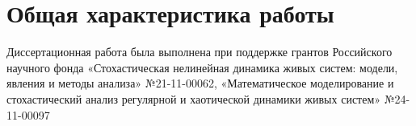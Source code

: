 \section*{Общая характеристика работы}

\newcommand{\actuality}{\pdfbookmark[1]{Актуальность}{actuality}\underline{\textbf{\actualityTXT}}}
\newcommand{\progress}{\pdfbookmark[1]{Разработанность темы}{progress}\underline{\textbf{\progressTXT}}}
\newcommand{\aim}{\pdfbookmark[1]{Цели}{aim}\underline{{\textbf\aimTXT}}}
\newcommand{\tasks}{\pdfbookmark[1]{Задачи}{tasks}\underline{\textbf{\tasksTXT}}}
\newcommand{\aimtasks}{\pdfbookmark[1]{Цели и задачи}{aimtasks}\aimtasksTXT}
\newcommand{\novelty}{\pdfbookmark[1]{Научная новизна}{novelty}\underline{\textbf{\noveltyTXT}}}
\newcommand{\influence}{\pdfbookmark[1]{Практическая значимость}{influence}\underline{\textbf{\influenceTXT}}}
\newcommand{\methods}{\pdfbookmark[1]{Методология и методы исследования}{methods}\underline{\textbf{\methodsTXT}}}
\newcommand{\defpositions}{\pdfbookmark[1]{Положения, выносимые на защиту}{defpositions}\underline{\textbf{\defpositionsTXT}}}
\newcommand{\reliability}{\pdfbookmark[1]{Достоверность}{reliability}\underline{\textbf{\reliabilityTXT}}}
\newcommand{\probation}{\pdfbookmark[1]{Апробация}{probation}\underline{\textbf{\probationTXT}}}
\newcommand{\contribution}{\pdfbookmark[1]{Личный вклад}{contribution}\underline{\textbf{\contributionTXT}}}
\newcommand{\publications}{\pdfbookmark[1]{Публикации}{publications}\underline{\textbf{\publicationsTXT}}}


Диссертационная работа была выполнена при поддержке грантов Российского научного фонда
 «Стохастическая нелинейная динамика живых систем: модели, явления и методы анализа» №21-11-00062,
 «Математическое моделирование и стохастический анализ регулярной и хаотической динамики живых систем» №24-11-00097


